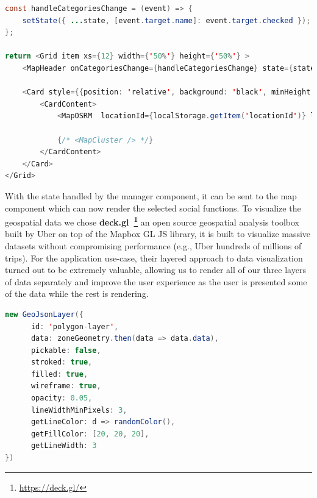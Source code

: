 \begin{lstlisting}[language=Java, caption={MapManagement component},  label={lst:mapManagement}]
const handleCategoriesChange = (event) => {
    setState({ ...state, [event.target.name]: event.target.checked });
};

return <Grid item xs={12} width={'50%'} height={'50%'} >     
    <MapHeader onCategoriesChange={handleCategoriesChange} state={state}/>
     
    <Card style={{position: 'relative', background: 'black', minHeight:'500px'}}>
        <CardContent>
            <MapOSRM  locationId={localStorage.getItem('locationId')} locationType={props.zone.type} categories={getCatIds()}/>

            {/* <MapCluster /> */}
        </CardContent>
    </Card>
</Grid>
\end{lstlisting}

With the state handled by the manager component, it can be sent to the map component which can now render the selected social functions. To visualize the geospatial data we chose \textbf{deck.gl~\footnote{\url{https://deck.gl/}}} an open source geospatial analysis toolbox built by Uber on top of the Mapbox GL JS library, it is built to visualize massive datasets without compromising performance (e.g., Uber hundreds of millions of trips). For the application use-case, their layered approach to data visualization turned out to be extremely valuable, allowing us to render all of our three layers of data separately and improve the user experience as the user is presented some of the data while the rest is rendering.

\begin{lstlisting}[language=Java, caption={Example of a GeoJSON layer, used to represent the zone geometry as seen in Fig. \ref{fig:overviewMap}}, label={lst:mapLayer}]
new GeoJsonLayer({
      id: 'polygon-layer',
      data: zoneGeometry.then(data => data.data),
      pickable: false,
      stroked: true,
      filled: true,
      wireframe: true,
      opacity: 0.05,
      lineWidthMinPixels: 3,
      getLineColor: d => randomColor(),
      getFillColor: [20, 20, 20],
      getLineWidth: 3
})
\end{lstlisting}

